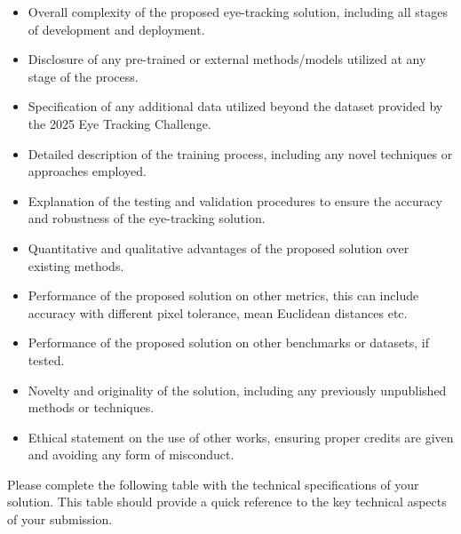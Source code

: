 \documentclass{article}
\begin{document}
\begin{itemize}
    \item Overall complexity of the proposed eye-tracking solution, including all stages of development and deployment.
    \item Disclosure of any pre-trained or external methods/models utilized at any stage of the process.
    \item Specification of any additional data utilized beyond the dataset provided by the 2025 Eye Tracking Challenge.
    \item Detailed description of the training process, including any novel techniques or approaches employed.
    \item Explanation of the testing and validation procedures to ensure the accuracy and robustness of the eye-tracking solution.
    \item Quantitative and qualitative advantages of the proposed solution over existing methods.
    \item Performance of the proposed solution on other metrics, this can include accuracy with different pixel tolerance, mean Euclidean distances etc. 
    \item Performance of the proposed solution on other benchmarks or datasets, if tested.
    \item Novelty and originality of the solution, including any previously unpublished methods or techniques.
    \item Ethical statement on the use of other works, ensuring proper credits are given and avoiding any form of misconduct.
\end{itemize}

Please complete the following table with the technical specifications of your solution. This table should provide a quick reference to the key technical aspects of your submission.

\begin{table}[h]
    \centering
    \caption{Technical Specification of the Proposed Eye-Tracking Solution}
    \label{tab:eye_tracking_solution}
\end{table}
\end{document}
